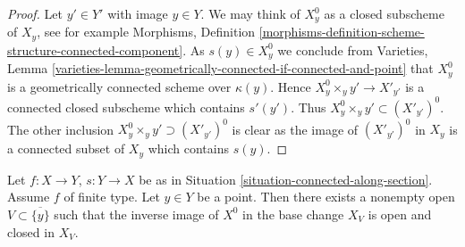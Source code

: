 \begin{proof}
Let $y' \in Y'$ with image $y \in Y$. We may think of
$X^0_y$ as a closed subscheme of $X_y$, see for example
Morphisms,
Definition \ref{morphisms-definition-scheme-structure-connected-component}.
As $s(y) \in X^0_y$ we conclude from
Varieties, Lemma
\ref{varieties-lemma-geometrically-connected-if-connected-and-point}
that $X_y^0$ is a geometrically connected scheme over $\kappa(y)$.
Hence $X_y^0 \times_y y' \to X'_{y'}$ is a connected closed subscheme
which contains $s'(y')$. Thus $X_y^0 \times_y y' \subset (X'_{y'})^0$.
The other inclusion $X_y^0 \times_y y' \supset (X'_{y'})^0$ is clear
as the image of $(X'_{y'})^0$ in $X_y$ is a connected subset of $X_y$ which
contains $s(y)$.
\end{proof}

\begin{lemma}
\label{lemma-connected-along-section-good}
Let $f : X \to Y$, $s : Y \to X$ be as in
Situation \ref{situation-connected-along-section}.
Assume $f$ of finite type. Let $y \in Y$ be a point.
Then there exists a nonempty open $V \subset \overline{\{y\}}$ such that
the inverse image of $X^0$ in the base change $X_V$ is open and closed in
$X_V$.
\end{lemma}

